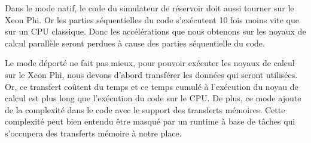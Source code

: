 Dans le mode natif, le code du simulateur de réservoir doit aussi tourner sur le Xeon Phi.
%
Or les parties séquentielles du code s'exécutent 10 fois moins vite que sur un CPU classique.
%
Donc les accélérations que nous obtenons sur les noyaux de calcul parallèle seront perdues à cause des parties séquentielle du code.


Le mode déporté ne fait pas mieux, pour pouvoir exécuter les noyaux de calcul sur le Xeon Phi, nous devons d'abord transférer les données qui seront utilisées.
%
Or, ce transfert coûtent du temps et ce temps cumulé à l'exécution du noyau de calcul est plus long que l'exécution du code sur le CPU.
%
De plus, ce mode ajoute de la complexité dans le code avec le support des transferts mémoires.
%
Cette complexité peut bien entendu être masqué par un runtime à base de tâches qui s'occupera des transferts mémoire à notre place.
